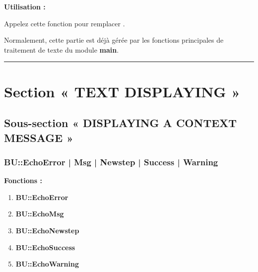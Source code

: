 \documentclass[a4paper,10pt]{article}
\begin{document}
\begin{justify}
    \textbf{Utilisation :}

    Appelez cette fonction pour remplacer .
\end{justify}

\begin{justify}
    Normalement, cette partie est déjà gérée par les fonctions principales de traitement de texte du module \textbf{main}.
\end{justify}





\color{sec1}\par\noindent\rule{\textwidth}{0.4pt}\color{text}

\color{sec1}
\section{Section « TEXT DISPLAYING »}\color{text}

\color{sec2}
\subsection{Sous-section « DISPLAYING A CONTEXT MESSAGE »}\color{text}

\color{sec3}
\subsubsection{BU::EchoError | Msg | Newstep | Success | Warning}\color{text}

\begin{justify}
    \textbf{Fonctions :}
    \begin{enumerate}
        \item \textbf{\color{red}BU::EchoError}
        \item \textbf{\color{text}BU::EchoMsg}
        \item \textbf{\color{orange}BU::EchoNewstep}
        \item \textbf{\color{green}BU::EchoSuccess}
        \item \textbf{\color{yellow}BU::EchoWarning}
    \end{enumerate}
\end{justify}
\end{document}
